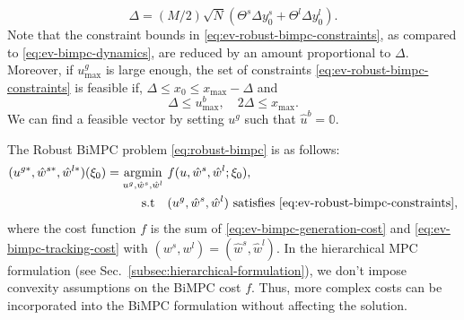 \begin{equation}
\label{eq:ev-robust-bimpc-delta}
    \Delta = (M/2) \sqrt{N} (\Theta^s \Delta y^s_0 + \Theta^l \Delta y^l_0).
\end{equation}
Note that the constraint bounds in \eqref{eq:ev-robust-bimpc-constraints}, as compared to \eqref{eq:ev-bimpc-dynamics}, are reduced by an amount proportional to $\Delta$.
Moreover, if $u^g_\text{max}$ is large enough, the set of constraints \eqref{eq:ev-robust-bimpc-constraints} is feasible if, $\Delta \leq x_0 \leq x_\text{max} - \Delta$ and
\begin{equation}
\label{eq:ev-robust-constraints-feasibility}
    \Delta \leq u^b_\text{max}, \quad 2\Delta \leq x_\text{max}.
\end{equation}
We can find a feasible vector by setting $u^g$ such that $\hat{u}^b = \mathbb{0}$.

The Robust BiMPC problem \eqref{eq:robust-bimpc} is as follows:
\begin{align}
\label{eq:ev-bimpc}
    (u^{g*}, \hat{w}^{s*}, \hat{w}^{l*}) (\xi_0) = \operatorname*{argmin}_{u^g, \hat{w}^s, \hat{w}^l} \ & f(u, \hat{w}^s, \hat{w}^l; \xi_0), \\
    \text{s.t} \quad &
    (u^g, \hat{w}^s, \hat{w}^l) \text{ satisfies \eqref{eq:ev-robust-bimpc-constraints}}, \nonumber
\end{align}
where the cost function $f$ is the sum of \eqref{eq:ev-bimpc-generation-cost} and \eqref{eq:ev-bimpc-tracking-cost} with $(w^s, w^l) = (\hat{w}^s, \hat{w}^l)$.
In the hierarchical MPC formulation (see Sec.~\ref{subsec:hierarchical-formulation}), we don't impose convexity assumptions on the BiMPC cost $f$.
Thus, more complex costs can be incorporated into the BiMPC formulation without affecting the solution.

